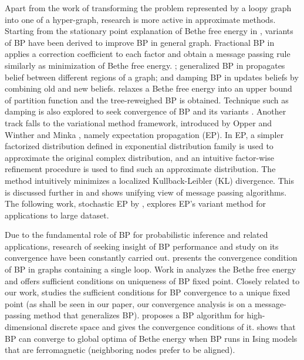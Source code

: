 Apart from the work of transforming the problem represented by a loopy graph into one of a hyper-graph, research is more active in approximate methods. Starting from the stationary point explanation of Bethe free energy in \cite{Yedidia:2000:GBP:3008751.3008848}, variants of BP have been derived to improve BP in general graph. Fractional BP in \cite{Wiegerinck:2002:FBP:2968618.2968673} applies a correction coefficient to each factor and obtain a message passing rule similarly as minimization of Bethe free energy. 
; generalized BP in \cite{Yedidia:2000:GBP:3008751.3008848} propagates belief between different regions of a graph; and damping BP in \cite{Pretti2005damping} updates beliefs by combining old and new beliefs. \cite{wainwright2008graphical} relaxes a Bethe free energy into an upper bound of partition function and the tree-reweighed BP is obtained. Technique such as damping is also explored to seek convergence of BP and its variants \cite{Pretti2005damping}.
Another track falls to the variational method framework, introduced by Opper and Winther \cite{Opper:2000:GPC:1121900.1121911} and Minka \cite{Minka:2001:EPA:647235.720257, Minka:2001:FAA:935427}, namely expectation propagation (EP). In EP, a simpler factorized distribution defined in exponential distribution family is used to approximate the original complex distribution, and an intuitive factor-wise refinement procedure is used to find such an approximate distribution. The method intuitively minimizes a localized Kullback-Leibler (KL) divergence. This is discussed further in \cite{divergence-measures-and-message-passing} and  shows unifying view of message passing algorithms. The following work, stochastic EP by \cite{yingzhen2015sep}, explores EP's variant method for applications to large dataset.

Due to the fundamental role of BP for probabilistic inference and related applications, research of seeking insight of BP performance and study on its convergence have been constantly carried out.  \cite{weiss2000correctness} presents the convergence condition of BP in graphs containing a single loop. Work in \cite{heskes2004uniqueness} analyzes the Bethe free energy and offers sufficient conditions on uniqueness of BP fixed point.
{Closely related to our work, \cite{mooij2012sufficient-conditions} studies the sufficient conditions for BP convergence to a unique fixed point (as shall be seen in our paper, our convergence analysis is on a message-passing method that generalizes BP).}
\cite{nima2013stochasticBP} proposes a BP algorithm for high-dimensional discrete space and gives the convergence conditions of it. \cite{frederic2019fast} shows that BP can converge to global optima of Bethe energy when BP runs in Ising models that are ferromagnetic (neighboring nodes prefer to be aligned).

